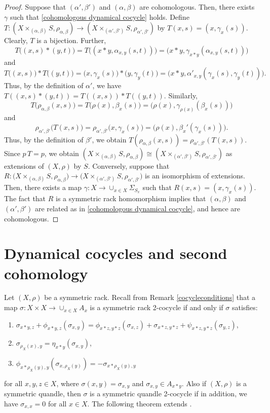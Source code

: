 \documentclass[11pt,reqno]{amsart}
\theoremstyle{definition}
\numberwithin{equation}{subsection}
\begin{document}
\begin{proof}
Suppose that $(\alpha',\beta')$ and $(\alpha, \beta)$ are cohomologous. Then, there exists $\gamma$ such that  \eqref{cohomologous dynamical cocycle} holds. Define
$T:(X \times_{(\alpha,\beta)}S,\rho_{\alpha,\beta}) \rightarrow (X \times_{(\alpha',\beta')}S,\rho_{\alpha',\beta'})$ by $T(x,s) = (x, \gamma_x(s)).$ Clearly, $T$ is a bijection. Further,
$$T\big((x,s)*(y,t)\big)=T\big((x*y,\alpha_{x,y}(s,t))\big)=\big(x*y,\gamma_{x*y}(\alpha_{x,y}(s,t))\big)$$ and 
$$T\big((x,s)\big)*T \big((y,t) \big)=\big(x,\gamma_x(s)\big)*\big(y,\gamma_y(t)\big)=\big(x*y,\alpha'_{x, y}(\gamma_x(s),\gamma_{y}(t))\big).$$
Thus, by the definition of $\alpha'$, we have $T((x,s)*(y,t))=T((x,s))*T((y,t)).$  Similarly, 
$$T\big(\rho_{\alpha,\beta}(x,s) \big)=T \big(\rho(x),\beta_x(s) \big)=\big(\rho(x),\gamma_{\rho(x)}(\beta_x(s))\big)$$ and
$$\rho_{\alpha',\beta'}\big(T(x,s)\big)=\rho_{\alpha',\beta'} \big(x,\gamma_{x}(s)\big)=\big(\rho(x),\beta_x'(\gamma_{x}(s))\big).$$
Thus, by the definition of $\beta'$, we obtain $T(\rho_{\alpha,\beta}(x,s))=\rho_{\alpha',\beta'}(T(x,s)).$ Since $p \, T=p$,  we obtain $(X \times_{(\alpha,\beta)}S,\rho_{\alpha,\beta})\cong (X \times_{(\alpha',\beta')}S,\rho_{\alpha',\beta'})$ as extensions of $(X,\rho)$ by $S$. Conversely, suppose that $R: \big(X \times_{(\alpha,\beta)}S,\rho_{\alpha,\beta}\big) \to \big(X \times_{(\alpha',\beta')}S,\rho_{\alpha',\beta'}\big)$ is an isomorphism of extensions. Then, there exists a map $\gamma:X \rightarrow \cup_{x \in X} \Sigma_{S_{x}}$ such that $R(x,s) = (x,\gamma_x(s))$.  The fact that $R$ is a symmetric rack homomorphism implies that  $(\alpha,\beta)$ and $(\alpha',\beta')$ are related as in \eqref{cohomologous dynamical cocycle}, and hence are cohomologous. 
\end{proof}
\medskip

\section{Dynamical cocycles and second cohomology}\label{sec dynamical cocycle and second cohomology}
	Let $(X,\rho)$ be a symmetric rack. Recall from Remark \ref{cocycleconditions} that a map $\sigma:X \times X \rightarrow \cup_{x \in X} A_{x}$ is a 
symmetric rack 2-cocycle if and only if $\sigma$ satisfies:
\begin{enumerate}\label{cocycle condition}
	\item [$\mathrm{(F1)}$]$\sigma_{x \ast y,z}+\phi_{x \ast y,z}(\sigma_{x,y})=\phi_{x \ast z, y \ast z}(\sigma_{x,z})+\sigma_{x \ast z, y \ast z}+\psi_{x \ast z, y \ast z}(\sigma_{y,z})$,
	\item[$\mathrm{(F2)}$] $\sigma_{\rho_X(x),y}=\eta_{x\ast y}(\sigma_{x,y})$,
	\item[$\mathrm{(F3)}$] $\phi_{x\ast \rho_X(y),y}(\sigma_{x,\rho_X(y)})=-\sigma_{x \ast \rho_X(y),y}$
\end{enumerate}	
for all $x,y,z \in X$, where $\sigma(x,y)=\sigma_{x,y}$ and $\sigma_{x,y} \in A_{x*y}$. Also if $(X,\rho)$ is a symmetric quandle, then $\sigma$ is  a symmetric quandle 2-cocycle if in addition, we have $\sigma_{x,x}=0$ for all $x \in X$. The following theorem extends \cite[Proposition 2.25]{MR1994219}.
 
\end{document}
